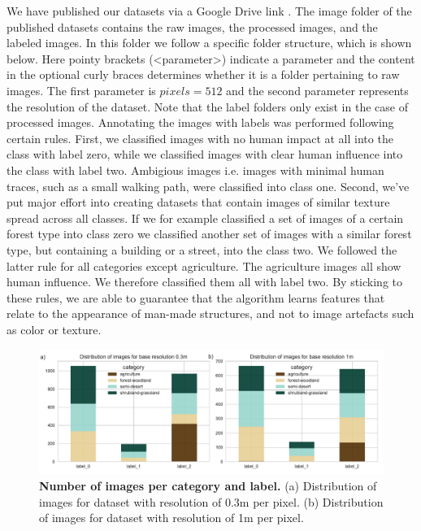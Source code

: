 We have published our datasets via a Google Drive link \parencite{datasets}. The image folder of the published datasets contains the raw images, the processed images, and the labeled images. In this folder we follow a specific folder structure, which is shown below. Here pointy brackets (<parameter>) indicate a parameter and the content in the optional curly braces determines whether it is a folder pertaining to raw images. The first parameter is $pixels = 512$ and the second parameter represents the resolution of the dataset. Note that the label folders only exist in the case of processed images.
\vspace{10px}
\vspace{10px}
Annotating the images with labels was performed following certain rules. First, we classified images with no human impact at all into the class with label zero,  while we classified images with clear human influence into the class with label two. Ambigious images i.e. images with minimal human traces, such as a small walking path, were classified into class one. Second, we've put major effort into creating datasets that contain images of similar texture spread across all classes. If we for example classified a set of images of a certain forest type into class zero we classified another set of images with a similar forest type, but containing a building or a street, into the class two. We followed the latter rule for all categories except agriculture. The agriculture images all show human influence. We therefore classified them all with label two. By sticking to these rules, we are able to guarantee that the algorithm learns features that relate to the appearance of man-made structures, and not to image artefacts such as color or texture.

\begin{figure}[h!]
	\centering
	\captionsetup{width=1\linewidth}
	\includegraphics[width=1\textwidth]{Figures/imstats.pdf}
	\caption{\textbf{Number of images per category and label.} (a) Distribution of images for dataset with resolution of 0.3m per pixel. (b) Distribution of images for dataset with resolution of 1m per pixel.}
	\label{fig:imstats}
\end{figure}

